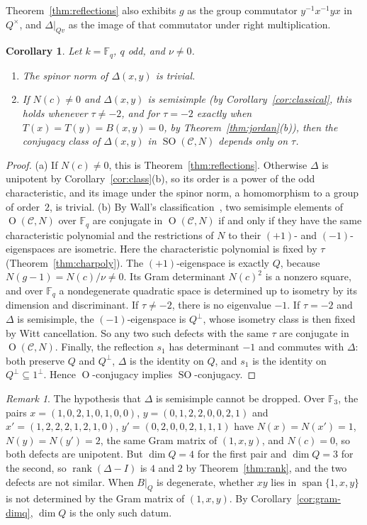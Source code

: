 \documentclass[11pt]{amsart}
\newtheorem{corollary}[theorem]{Corollary}
\theoremstyle{definition}
\theoremstyle{remark}
\newtheorem{remark}[theorem]{Remark}
\newcommand{\F}{\mathbb{F}}
\newcommand{\C}{\mathcal{C}}
\DeclareMathOperator{\rank}{rank}
\DeclareMathOperator{\Ort}{O}
\DeclareMathOperator{\SO}{SO}
\DeclareMathOperator{\spn}{span}
\begin{document}
Theorem~\ref{thm:reflections} also exhibits $g$ as the group commutator
$y^{-1}x^{-1}yx$ in $Q^\times$, and $\Delta|_{Qv}$ as the image of that
commutator under right multiplication.

\begin{corollary}\label{cor:so-class}
Let $k=\F_q$, $q$ odd, and $\nu\neq0$.
\begin{enumerate}[label=\textup{(\alph*)}]
\item The spinor norm of $\Delta(x,y)$ is trivial.
\item If $N(c)\neq0$ and $\Delta(x,y)$ is semisimple (by
  Corollary~\ref{cor:classical}, this holds whenever $\tau\neq-2$, and for
  $\tau=-2$ exactly when $T(x)=T(y)=B(x,y)=0$, by
  Theorem~\ref{thm:jordan}(b)), then the
  conjugacy class of $\Delta(x,y)$ in $\SO(\C,N)$ depends only on $\tau$.
\end{enumerate}
\end{corollary}

\begin{proof}
(a) If $N(c)\neq0$, this is Theorem~\ref{thm:reflections}. Otherwise
$\Delta$ is unipotent by Corollary~\ref{cor:class}(b), so its order is a
power of the odd characteristic, and its image under the spinor norm, a
homomorphism to a group of order~$2$, is trivial.
(b) By Wall's classification~\cite{wall1963}, two semisimple elements of
$\Ort(\C,N)$ over $\F_q$ are conjugate in $\Ort(\C,N)$ if and only if they
have the same characteristic polynomial and the restrictions of $N$ to their
$(+1)$- and $(-1)$-eigenspaces are isometric. Here the characteristic
polynomial is fixed by $\tau$ (Theorem~\ref{thm:charpoly}). The
$(+1)$-eigenspace is exactly $Q$, because $N(g-1)=N(c)/\nu\neq0$. Its Gram
determinant $N(c)^2$ is a nonzero square, and over $\F_q$ a nondegenerate
quadratic space is determined up to isometry by its dimension and
discriminant. If $\tau\neq-2$, there is no eigenvalue $-1$. If $\tau=-2$ and
$\Delta$ is semisimple, the $(-1)$-eigenspace is $Q^\perp$, whose isometry
class is then fixed by Witt cancellation. So any two such defects with the same
$\tau$ are conjugate in $\Ort(\C,N)$. Finally, the reflection $s_1$ has
determinant $-1$ and commutes with $\Delta$: both preserve $Q$ and $Q^\perp$,
$\Delta$ is the identity on $Q$, and $s_1$ is the identity on
$Q^\perp\subseteq1^\perp$. Hence $\Ort$-conjugacy implies $\SO$-conjugacy.
\end{proof}

\begin{remark}\label{rem:unipotent}
The hypothesis that $\Delta$ is semisimple cannot be dropped. Over $\F_3$, the
pairs $x=(1,0,2,1,0,1,0,0)$, $y=(0,1,2,2,0,0,2,1)$ and
$x'=(1,2,2,2,1,2,1,0)$, $y'=(0,2,0,0,2,1,1,1)$ have $N(x)=N(x')=1$,
$N(y)=N(y')=2$, the same Gram matrix of $(1,x,y)$, and $N(c)=0$, so both
defects are unipotent. But $\dim Q=4$ for the first pair and $\dim Q=3$ for
the second, so $\rank(\Delta-I)$ is $4$ and $2$ by Theorem~\ref{thm:rank}, and
the two defects are not similar. When $B|_Q$ is degenerate, whether $xy$ lies
in $\spn\{1,x,y\}$ is not determined by the Gram matrix of $(1,x,y)$. By
Corollary~\ref{cor:gram-dimq}, $\dim Q$ is the only such datum.
\end{remark}
\end{document}
